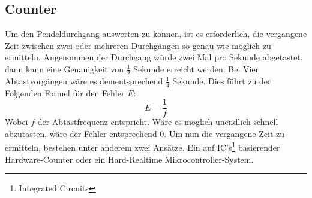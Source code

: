 \subsection{Counter}
	Um den Pendeldurchgang auswerten zu können, ist es erforderlich, die vergangene Zeit zwischen zwei oder mehreren Durchgängen so genau wie möglich zu ermitteln. Angenommen der Durchgang würde zwei Mal pro Sekunde abgetastet, dann kann eine Genauigkeit von $\frac{1}{2}$ Sekunde erreicht werden. Bei Vier Abtastvorgängen wäre es dementsprechend $\frac{1}{4}$ Sekunde. Dies führt zu der Folgenden Formel für den Fehler $E$:
	\[
		E = \frac{1}{f}
	\]
	Wobei $f$ der Abtastfrequenz entspricht. Wäre es möglich unendlich schnell abzutasten, wäre der Fehler entsprechend 0. Um nun die vergangene Zeit zu ermitteln, bestehen unter anderem zwei Ansätze. Ein auf IC's\footnote{Integrated Circuits} basierender Hardware-Counter oder ein Hard-Realtime Mikrocontroller-System.
